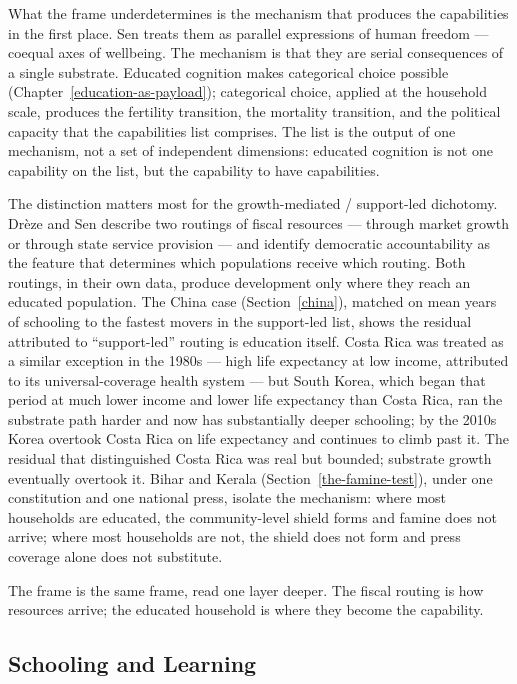 \documentclass[12pt,letterpaper]{article}
\begin{document}
What the frame underdetermines is the mechanism that produces the capabilities in the first place. Sen treats them as parallel expressions of human freedom --- coequal axes of wellbeing. The mechanism is that they are serial consequences of a single substrate. Educated cognition makes categorical choice possible (Chapter~\ref{education-as-payload}); categorical choice, applied at the household scale, produces the fertility transition, the mortality transition, and the political capacity that the capabilities list comprises. The list is the output of one mechanism, not a set of independent dimensions: educated cognition is not one capability on the list, but the capability to have capabilities.

The distinction matters most for the growth-mediated / support-led dichotomy. Drèze and Sen describe two routings of fiscal resources --- through market growth or through state service provision --- and identify democratic accountability as the feature that determines which populations receive which routing. Both routings, in their own data, produce development only where they reach an educated population. The China case (Section~\ref{china}), matched on mean years of schooling to the fastest movers in the support-led list, shows the residual attributed to ``support-led'' routing is education itself. Costa Rica was treated as a similar exception in the 1980s --- high life expectancy at low income, attributed to its universal-coverage health system --- but South Korea, which began that period at much lower income and lower life expectancy than Costa Rica, ran the substrate path harder and now has substantially deeper schooling; by the 2010s Korea overtook Costa Rica on life expectancy and continues to climb past it. The residual that distinguished Costa Rica was real but bounded; substrate growth eventually overtook it. Bihar and Kerala (Section~\ref{the-famine-test}), under one constitution and one national press, isolate the mechanism: where most households are educated, the community-level shield forms and famine does not arrive; where most households are not, the shield does not form and press coverage alone does not substitute.

The frame is the same frame, read one layer deeper. The fiscal routing is how resources arrive; the educated household is where they become the capability.

\subsection{Schooling and Learning}\label{schooling-and-learning}
\end{document}
